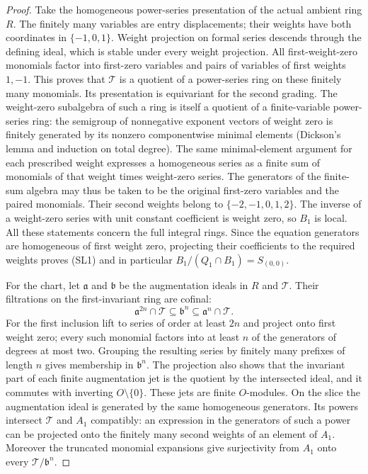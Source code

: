 \begin{proof}
Take the homogeneous power-series presentation of the
actual ambient ring \(R\). The finitely many variables
are entry displacements; their weights have both
coordinates in \(\{-1,0,1\}\). Weight projection on
formal series descends through the defining ideal,
which is stable under every weight projection.
All first-weight-zero monomials factor into first-zero
variables and pairs of variables of first weights \(1,-1\).
This proves that \(\mathscr T\) is a quotient of a
power-series ring on these finitely many monomials.
Its presentation is equivariant for the second grading.
The weight-zero subalgebra of such a ring is itself a
quotient of a finite-variable power-series ring: the
semigroup of nonnegative exponent vectors of weight zero
is finitely generated by its nonzero componentwise
minimal elements (Dickson's lemma and induction on
total degree). The same minimal-element argument for
each prescribed weight expresses a homogeneous series
as a finite sum of monomials of that weight times
weight-zero series. The generators of the finite-sum
algebra may thus be taken to be the original first-zero
variables and the paired monomials. Their second weights
belong to \(\{-2,-1,0,1,2\}\). The inverse of a weight-zero
series with unit constant coefficient is weight zero,
so \(B_1\) is local. All these statements concern the
full integral rings. Since the equation generators
are homogeneous of first weight zero, projecting their
coefficients to the required weights proves (SL1)
and in particular
\(B_1/(Q_1\cap B_1)=S_{(0,0)}\).

For the chart, let \(\mathfrak a\) and \(\mathfrak b\)
be the augmentation ideals in \(R\) and \(\mathscr T\).
Their filtrations on the first-invariant ring are
cofinal:
\[
 \mathfrak a^{2n}\cap\mathscr T\subseteq\mathfrak b^n
 \subseteq\mathfrak a^n\cap\mathscr T .
\]
For the first inclusion lift to series of order at
least \(2n\) and project onto first weight zero;
every such monomial factors into at least \(n\)
of the generators of degrees at most two.
Grouping the resulting series by finitely many
prefixes of length \(n\) gives membership in
\(\mathfrak b^n\). The projection also shows that
the invariant part of each finite augmentation jet
is the quotient by the intersected ideal, and it
commutes with inverting \(O\setminus\{0\}\).
These jets are finite \(O\)-modules.
On the slice the augmentation ideal is generated by
the same homogeneous generators. Its powers intersect
\(\mathscr T\) and \(A_1\) compatibly: an expression
in the generators of such a power can be projected
onto the finitely many second weights of an element
of \(A_1\). Moreover the truncated monomial expansions
give surjectivity from \(A_1\) onto every
\(\mathscr T/\mathfrak b^n\).


\end{proof}
